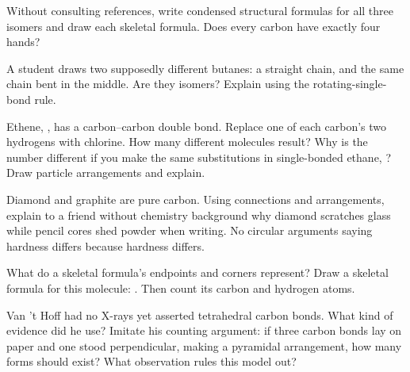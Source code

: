 \begin{sikaoti}
\item Without consulting references, write condensed structural formulas for all three  isomers and draw each skeletal formula. Does every carbon have exactly four hands?
\item A student draws two supposedly different butanes: a straight chain, and the same chain bent in the middle. Are they isomers? Explain using the rotating-single-bond rule.
\item Ethene, , has a carbon--carbon double bond. Replace one of each carbon's two hydrogens with chlorine. How many different molecules result? Why is the number different if you make the same substitutions in single-bonded ethane, ? Draw particle arrangements and explain.
\item Diamond and graphite are pure carbon. Using connections and arrangements, explain to a friend without chemistry background why diamond scratches glass while pencil cores shed powder when writing. No circular arguments saying hardness differs because hardness differs.
\item What do a skeletal formula's endpoints and corners represent? Draw a skeletal formula for this molecule: . Then count its carbon and hydrogen atoms.
\item Van 't Hoff had no X-rays yet asserted tetrahedral carbon bonds. What kind of evidence did he use? Imitate his counting argument: if three carbon bonds lay on paper and one stood perpendicular, making a pyramidal arrangement, how many  forms should exist? What observation rules this model out?
\end{sikaoti}
